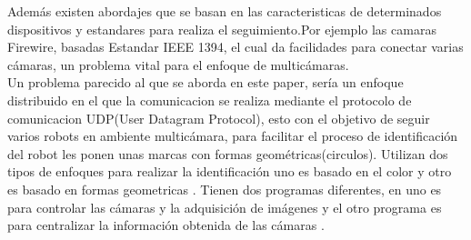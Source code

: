 Adem\'as existen abordajes que se basan en las caracteristicas de determinados dispositivos y estandares para realiza el seguimiento.Por ejemplo las camaras Firewire, basadas Estandar IEEE 1394, el cual da facilidades para conectar varias c\'amaras, un problema vital para el enfoque de multic\'amaras\cite{kumar_mot}.\\
Un problema parecido al que se aborda en este paper, ser\'ia un enfoque distribuido en el que la comunicacion se realiza mediante el protocolo de comunicacion UDP(User Datagram Protocol), esto con el objetivo de seguir varios robots en ambiente multic\'amara, para facilitar el proceso de identificaci\'on del robot les ponen unas marcas con formas geom\'etricas(circulos). Utilizan dos tipos de enfoques para realizar la identificaci\'on uno es basado en el color y otro es basado en formas geometricas . Tienen dos programas diferentes, en uno es para controlar las c\'amaras y la adquisici\'on de im\'agenes y el otro programa es para centralizar la informaci\'on obtenida de las c\'amaras \cite{garcia_mot}. \\

